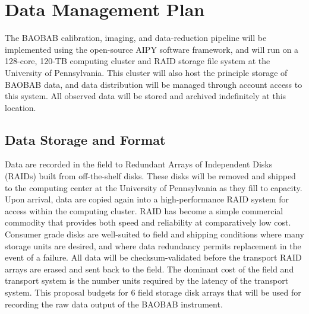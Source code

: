 \documentclass[11pt]{article}
\begin{document}
\pagestyle{empty}

%

\section*{Data Management Plan}

The BAOBAB calibration, imaging, and data-reduction pipeline will be
implemented using the open-source AIPY software framework, and will run on a
128-core, 120-TB computing cluster and RAID storage file system
at the University of Pennsylvania.  This cluster
will also host the principle storage of BAOBAB data, and data distribution will
be managed through account access to this system.  All observed data
will be stored and archived indefinitely at this location.

\subsection*{Data Storage and Format}

Data are recorded in the field to Redundant Arrays of Independent Disks (RAIDs)
built from off-the-shelf disks. These disks will be removed and shipped to the
computing center at the University of Pennsylvania as they fill to capacity.
Upon arrival, data are copied again into a high-performance RAID system for
access within the computing cluster. RAID has become a simple commercial
commodity that provides both speed and reliability at comparatively low cost.
Consumer grade disks are well-suited to field and shipping conditions where
many storage units are desired, and where data redundancy permits replacement
in the event of a failure.
All data will be checksum-validated before the
transport RAID arrays are erased and sent back to the field.  The dominant cost
of the field and transport system is the number units required by the latency
of the transport system.  This proposal budgets for 6 field storage disk arrays
that will be used for recording the raw data output of the BAOBAB instrument.
\end{document}
